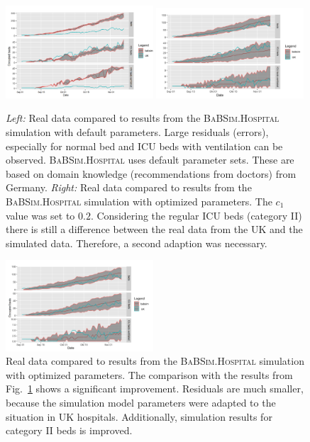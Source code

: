 \documentclass[conference]{IEEEtran}
\newcommand{\babsimhospital}{\textsc{BaBSim.Hospital}\xspace}
\begin{document}
\begin{figure}[t]
  \centering
   \includegraphics[width=0.49\textwidth]{default.png}
    \includegraphics[width=0.49\textwidth]{optimzed01b.png}
  \caption{\emph{Left:}\/ Real data compared to results from the \babsimhospital simulation with default parameters. Large residuals (errors), especially for normal bed and ICU beds with ventilation can be observed.
   \babsimhospital uses default parameter sets. These are based on domain knowledge (recommendations from doctors) from Germany. \emph{Right:}\/ Real data compared to results from the \babsimhospital simulation with optimized parameters. The  $c_1$ value was set to $0.2$. Considering the regular \gls{ICU} beds (category II) there is still a difference between the real data from the UK and the simulated data. Therefore, a second adaption was necessary. }
\label{fig:default}
\end{figure}
\begin{figure}[t]
    \centering
    \includegraphics[width=0.49\textwidth]{optimized02.png}
    \caption{Real data compared to results from the \babsimhospital simulation with optimized parameters. The comparison with the results from Fig.~\ref{fig:default} shows a significant improvement. Residuals are much smaller,
    because the simulation model parameters were adapted to the situation in UK hospitals. Additionally, simulation results for category II beds is improved.  
  }
\label{fig:optimized02}
\end{figure}
\end{document}
